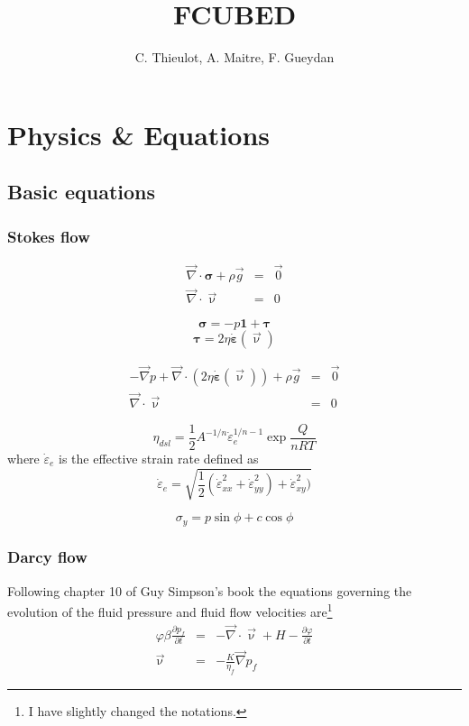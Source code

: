 \documentclass[a4paper]{article}
\title{FCUBED}
\author{C. Thieulot, A. Maitre, F. Gueydan}
\begin{document}
\maketitle
\tableofcontents

\textcite{grfr03}

\newpage
\section{Physics \& Equations}

\subsection{Basic equations}


\subsubsection{Stokes flow}

\begin{eqnarray}
\vec\nabla \cdot \bm \sigma + \rho \vec{g} &=& \vec{0} \\
\vec\nabla \cdot \vec\upnu &=& 0
\end{eqnarray}

\[
\bm\sigma = -p {\bm 1} +  \bm \tau
\]
\[
\bm\tau = 2 \eta \dot{\bm \varepsilon}(\vec\upnu)
\]

\begin{eqnarray}
-\vec\nabla p + \vec\nabla \cdot (2 \eta \dot{\bm \varepsilon}(\vec\upnu)) + \rho \vec{g} &=& \vec{0} \\
\vec\nabla \cdot \vec\upnu &=& 0
\end{eqnarray}

\[
\eta_{dsl} = \frac{1}{2} A^{-1/n} \dot\varepsilon_e^{1/n-1} 
\exp \frac{Q }{nRT}
\]
where $\dot\varepsilon_e$ is the effective strain rate defined as 
\[
\dot\varepsilon_e = \sqrt{\frac12 (
\dot\varepsilon_{xx}^2+
\dot\varepsilon_{yy}^2)+
\dot\varepsilon_{xy}^2
)} 
\]


\[
\sigma_y = p \sin\phi + c \cos \phi
\]


\subsubsection{Darcy flow}

Following chapter 10 of Guy Simpson's book \textcite{simp17} 
the equations governing the evolution of the fluid pressure and 
fluid flow velocities are\footnote{I have slightly 
changed the notations.}
\begin{eqnarray}
\varphi \beta \frac{\partial p_f}{\partial t} &=& -\vec\nabla \cdot \vec \upnu + H -\frac{\partial \varphi}{\partial t}\label{eq:128:a}\\
\vec\upnu &=& -\frac{K}{\eta_f} \vec\nabla p_f \label{eq:128:b}
\end{eqnarray}
\end{document}
